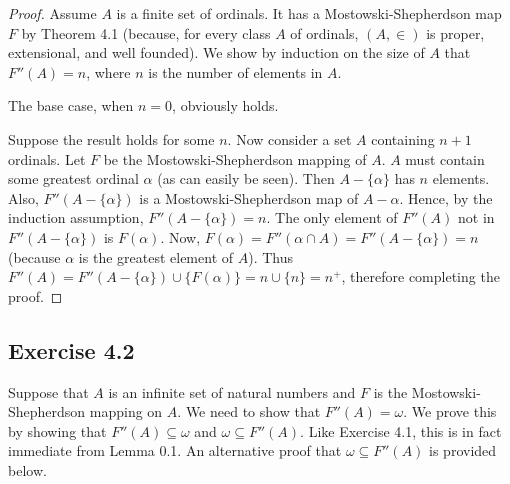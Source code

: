 \documentclass{article}
\theoremstyle{definition}
\begin{document}
\begin{proof}
Assume $A$ is a finite set of ordinals. It has a Mostowski-Shepherdson map $F$ by Theorem 4.1 (because, for every class 
$A$ of ordinals, $(A,\in)$ is proper, extensional, and well founded). We show by induction on the size of $A$ that 
$F''(A)=n$, where $n$ is the number of elements in $A$.

The base case, when $n=0$, obviously holds.

Suppose the result holds for some $n$. Now consider a set $A$ containing $n+1$ ordinals. Let $F$ be the Mostowski-Shepherdson 
mapping of $A$. $A$ must contain some greatest ordinal 
$\alpha$ (as can easily be seen). Then $A-\{\alpha\}$ has $n$ elements. Also, $F''(A-\{\alpha\})$ is a Mostowski-Shepherdson map of 
$A-\alpha$. Hence, by the induction assumption, $F''(A-\{\alpha\})=n$. The only element of 
$F''(A)$ not in $F''(A-\{\alpha\})$ is $F(\alpha)$. Now, 
$F(\alpha)=F''(\alpha\cap A)=F''(A-\{\alpha\})=n$ (because $\alpha$ is the greatest element of $A$). Thus 
$F''(A)=F''(A-\{\alpha\})\cup\{F(\alpha)\}=n\cup\{n\}=n^+$, therefore completing the proof.
\end{proof}

\subsection*{Exercise 4.2}

Suppose that $A$ is an infinite set of natural numbers and $F$ is the Mostowski-Shepherdson mapping on $A$. We need 
to show that $F''(A)=\omega$. We prove this by showing that $F''(A)\subseteq\omega$ and $\omega\subseteq F''(A)$. Like 
Exercise 4.1, this is in fact immediate from Lemma 0.1. An alternative proof that 
$\omega\subseteq F''(A)$ is provided below.
\end{document}
